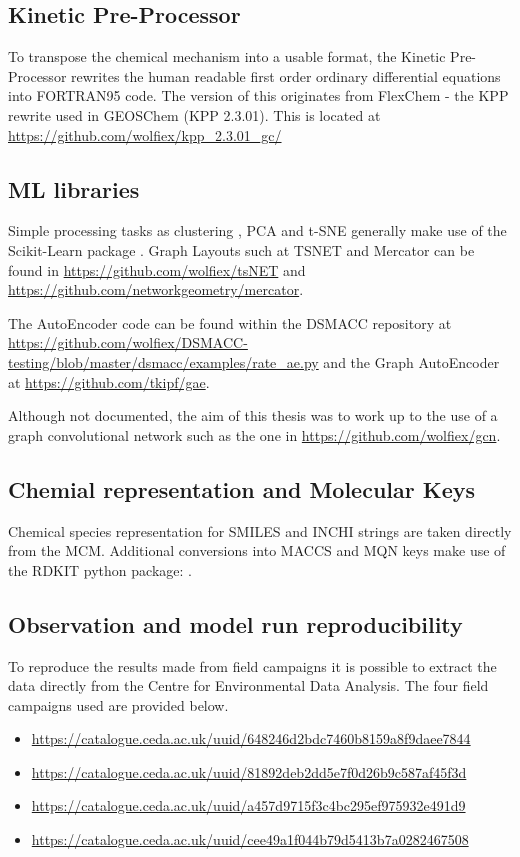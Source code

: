 \subsection*{Kinetic Pre-Processor}
To transpose the chemical mechanism into a usable format, the Kinetic Pre-Processor rewrites the human readable first order ordinary differential equations into FORTRAN95 code. The version of this originates from FlexChem  - the KPP rewrite used in GEOSChem (KPP 2.3.01). This is located at \url{https://github.com/wolfiex/kpp_2.3.01_gc/}

\subsection*{ML libraries}
Simple processing tasks as clustering , PCA and t-SNE generally make use of the Scikit-Learn package \citep{sklearn}.
Graph Layouts such at TSNET and Mercator can be found in \url{https://github.com/wolfiex/tsNET} and \url{https://github.com/networkgeometry/mercator}.

The AutoEncoder  code can be found within the DSMACC repository at \url{https://github.com/wolfiex/DSMACC-testing/blob/master/dsmacc/examples/rate_ae.py} and the Graph AutoEncoder at \url{https://github.com/tkipf/gae}.


Although not documented, the aim of this thesis was to work up to the use of a graph convolutional network such as the one in \url{https://github.com/wolfiex/gcn}.

\subsection*{Chemial representation and Molecular Keys}
Chemical species representation for SMILES and INCHI strings are taken directly from the MCM. Additional conversions into MACCS and MQN keys make use of the RDKIT  python package: \citep{rdkit}.

\subsection*{Observation and model run reproducibility}
To reproduce the results made from field campaigns it is possible to extract the data directly from the Centre for Environmental Data Analysis. The four field campaigns used are provided below.

\begin{itemize}
 \item{\url{https://catalogue.ceda.ac.uk/uuid/648246d2bdc7460b8159a8f9daee7844}}
 \item {\url{https://catalogue.ceda.ac.uk/uuid/81892deb2dd5e7f0d26b9c587af45f3d}}
 \item{\url{https://catalogue.ceda.ac.uk/uuid/a457d9715f3c4bc295ef975932e491d9}}
 \item {\url{https://catalogue.ceda.ac.uk/uuid/cee49a1f044b79d5413b7a0282467508}}
\end{itemize}

